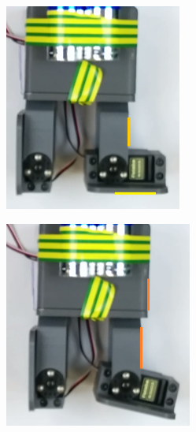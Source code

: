 \begin{figure}
\centering
\begin{minipage}{.5\textwidth}
  \centering
  \includegraphics[width=.7\textwidth]{Figures/Tobillo}
  \label{fig:Tobillo}
\end{minipage}%
\begin{minipage}{.5\textwidth}
  \centering
  \includegraphics[width=.7\textwidth]{Figures/Cadera}
  \label{fig:Cadera}
\end{minipage}
\end{figure}



